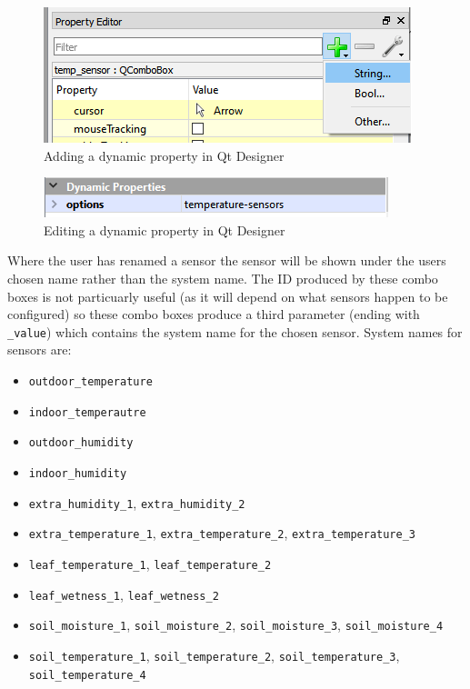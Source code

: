\documentclass[a4paper,10pt]{book}
\begin{document}
\begin {figure}[!ht]
 \centering
 \includegraphics[scale=1.0]{images/add_dynamic_property}
 \caption{Adding a dynamic property in Qt Designer}
\end {figure}

\begin {figure}[!ht]
 \centering
 \includegraphics[scale=1.0]{images/dynamic_property}
 \caption{Editing a dynamic property in Qt Designer}
\end {figure}

Where the user has renamed a sensor the sensor will be shown under the users chosen name rather than the system name. The ID produced by these combo boxes is not particuarly useful (as it will depend on what sensors happen to be configured) so these combo boxes produce a third parameter (ending with \verb|_value|) which contains the system name for the chosen sensor. System names for sensors are:
\begin{itemize}
\item \verb|outdoor_temperature|
\item \verb|indoor_temperautre|
\item \verb|outdoor_humidity|
\item \verb|indoor_humidity|
\item \verb|extra_humidity_1|, \verb|extra_humidity_2|
\item \verb|extra_temperature_1|, \verb|extra_temperature_2|, \verb|extra_temperature_3|
\item \verb|leaf_temperature_1|, \verb|leaf_temperature_2|
\item \verb|leaf_wetness_1|, \verb|leaf_wetness_2|
\item \verb|soil_moisture_1|, \verb|soil_moisture_2|, \verb|soil_moisture_3|, \verb|soil_moisture_4|
\item \verb|soil_temperature_1|, \verb|soil_temperature_2|, \verb|soil_temperature_3|, \verb|soil_temperature_4|
\end{itemize}
\end{document}
